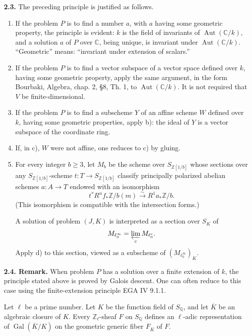 \documentclass[10pt]{article}
\newcommand{\C}{\mathbb C}
\newcommand{\Q}{\mathbb Q}
\newcommand{\Z}{\mathbb Z}
\newcommand{\Aut}{\operatorname{Aut}}
\newcommand{\Gal}{\operatorname{Gal}}
\newcommand{\iso}{\xrightarrow{\sim}}
\newcommand{\sourcebreak}{\clearpage}
\begin{document}
\noindent\textbf{2.3.} The preceding principle is justified as follows.
\begin{enumerate}[label=\alph*)]
\item If the problem \(P\) is to find a number \(a\), with \(a\) having some geometric property, the principle is evident: \(k\) is the field of invariants of \(\Aut(\C/k)\), and a solution \(a\) of \(P\) over \(\C\), being unique, is invariant under \(\Aut(\C/k)\). ``Geometric'' means: ``invariant under extension of scalars.''
\item If the problem \(P\) is to find a vector subspace of a vector space defined over \(k\), having some geometric property, apply the same argument, in the form Bourbaki, Algebra, chap. 2, \S8, Th. 1, to \(\Aut(\C/k)\). It is not required that \(V\) be finite-dimensional.

\sourcebreak
\item If the problem \(P\) is to find a subscheme \(Y\) of an affine scheme \(W\) defined over \(k\), having some geometric properties, apply b): the ideal of \(Y\) is a vector subspace of the coordinate ring.
\item If, in c), \(W\) were not affine, one reduces to c) by gluing.
\item For every integer \(b\geq3\), let \(M_b\) be the scheme over \(S_{\Z[1/b]}\) whose sections over any \(S_{\Z[1/b]}\)-scheme \(t:T\longrightarrow S_{\Z[1/b]}\) classify principally polarized abelian schemes \(a:A\longrightarrow T\) endowed with an isomorphism
\[
t^*R^nf_*\Z/b(m)\iso R^1a_*\Z/b.
\]
(This isomorphism is compatible with the intersection forms.)

A solution of problem \((J,K)\) is interpreted as a section over \(S_K\) of
\[
M_{\ell_0^\infty}=\varprojlim_c M_{\ell_0^c}.
\]
Apply d) to this section, viewed as a subscheme of \((M_{\ell_0^\infty})_K\).
\end{enumerate}

\noindent\textbf{2.4. Remark.} When problem \(P\) has a solution over a finite extension of \(k\), the principle stated above is proved by Galois descent. One can often reduce to this case using the finite-extension principle EGA IV 9.1.1.

Let \(\ell\) be a prime number. Let \(K\) be the function field of \(S_\Q\), and let \(\overline K\) be an algebraic closure of \(K\). Every \(\Z_\ell\)-sheaf \(F\) on \(S_\Q\) defines an \(\ell\)-adic representation of \(\Gal(\overline K/K)\) on the geometric generic fiber \(F_{\overline K}\) of \(F\).
\end{document}
